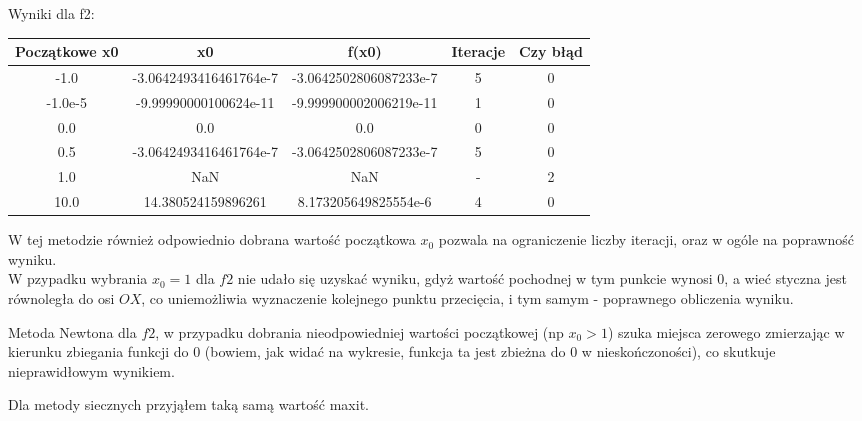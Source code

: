 \documentclass[15pt, a4paper]{article}
\begin{document}
\noindent Wyniki dla f2:
\begin{table}[ht]
\begin{adjustbox}{max width=\textwidth}
\begin{tabular}{|c|c|c|c|c|}
    \hline
    \textbf{Początkowe x0} & \textbf{x0} & \textbf{f(x0)} & \textbf{Iteracje} & \textbf{Czy błąd} \\
    \hline
    -1.0 & -3.0642493416461764e-7 & -3.0642502806087233e-7 & 5 & 0 \\
    \hline
    -1.0e-5 & -9.99990000100624e-11 & -9.999900002006219e-11 & 1 & 0 \\
    \hline
    0.0 & 0.0 & 0.0 & 0 & 0 \\
    \hline
    0.5 & -3.0642493416461764e-7 & -3.0642502806087233e-7 & 5 & 0 \\
    \hline
    1.0 & NaN & NaN & - & 2 \\
    \hline
    10.0 & 14.380524159896261 & 8.173205649825554e-6 & 4 & 0 \\
    \hline
\end{tabular}
\end{adjustbox}
\end{table}

\noindent W tej metodzie również odpowiednio dobrana wartość początkowa \( x_0 \) pozwala na ograniczenie liczby iteracji, oraz w ogóle na poprawność wyniku.\\ 
W pzypadku wybrania \(x_0 = 1\) dla \(f2\) nie udało się uzyskać wyniku, gdyż wartość pochodnej w tym punkcie wynosi 0, a wieć styczna jest równoległa do osi \(OX\), co uniemożliwia wyznaczenie kolejnego punktu przecięcia, i tym samym - poprawnego obliczenia wyniku. 


\noindent Metoda Newtona dla \(f2\), w przypadku dobrania nieodpowiedniej wartości początkowej (np \(x_0 > 1\)) szuka miejsca zerowego zmierzając w kierunku zbiegania funkcji do 0 (bowiem, jak widać na wykresie, funkcja ta jest zbieżna do 0 w nieskończoności), co skutkuje nieprawidłowym wynikiem. 


\pagebreak

\noindent Dla metody siecznych przyjąłem taką samą wartość maxit.
\end{document}
